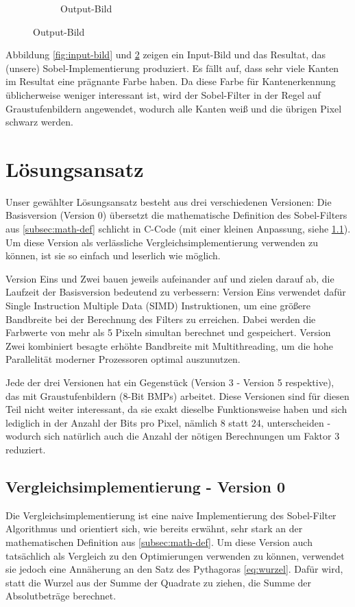 \documentclass[course=erap]{aspdoc}
\begin{document}
\begin{figure}[H]
\begin{subfigure}{.5\columnwidth}
        \caption{Output-Bild}
        \label{fig:output-bild}
    \end{subfigure}
\end{figure}

Abbildung \ref{fig:input-bild} und \ref{fig:output-bild} zeigen ein Input-Bild und das Resultat, das (unsere) Sobel-Implementierung produziert.
Es fällt auf, dass sehr viele Kanten im Resultat eine prägnante Farbe haben.
Da diese Farbe für Kantenerkennung üblicherweise weniger interessant ist, wird der Sobel-Filter in der Regel auf Graustufenbildern angewendet, wodurch alle Kanten weiß und die übrigen Pixel schwarz werden.

\section{Lösungsansatz}\label{sec:losungsansatz}
Unser gewählter Lösungsansatz besteht aus drei verschiedenen Versionen:
Die Basisversion (Version 0) übersetzt die mathematische Definition des Sobel-Filters aus \ref{subsec:math-def} schlicht in C-Code (mit einer kleinen Anpassung, siehe \ref{subsec:vergleichsimplementierung}).
Um diese Version als verlässliche Vergleichsimplementierung verwenden zu können, ist sie so einfach und leserlich wie möglich.

Version Eins und Zwei bauen jeweils aufeinander auf und zielen darauf ab, die Laufzeit der Basisversion bedeutend zu verbessern:
Version Eins verwendet dafür Single Instruction Multiple Data (SIMD) Instruktionen, um eine größere Bandbreite bei der Berechnung des Filters zu erreichen.
Dabei werden die Farbwerte von mehr als 5 Pixeln simultan berechnet und gespeichert.
Version Zwei kombiniert besagte erhöhte Bandbreite mit Multithreading, um die hohe Parallelität moderner Prozessoren optimal auszunutzen.

Jede der drei Versionen hat ein Gegenstück (Version 3 - Version 5 respektive), das mit Graustufenbildern (8-Bit BMPs) arbeitet.
Diese Versionen sind für diesen Teil nicht weiter interessant, da sie exakt dieselbe Funktionsweise haben und sich lediglich in der Anzahl der Bits pro Pixel, nämlich 8 statt 24, unterscheiden - wodurch sich natürlich auch die Anzahl der nötigen Berechnungen um Faktor 3 reduziert.

\subsection{Vergleichsimplementierung - Version 0}
\label{subsec:vergleichsimplementierung}
Die Vergleichsimplementierung ist eine naive Implementierung des Sobel-Filter Algorithmus und orientiert sich, wie bereits erwähnt, sehr stark an der mathematischen Definition aus \ref{subsec:math-def}.
Um diese Version auch tatsächlich als Vergleich zu den Optimierungen verwenden zu können, verwendet sie jedoch eine Annäherung an den Satz des Pythagoras \ref{eq:wurzel}.
Dafür wird, statt die Wurzel aus der Summe der Quadrate zu ziehen, die Summe der Absolutbeträge berechnet.
\end{document}

